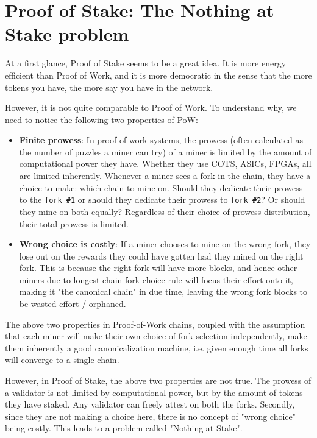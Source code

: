 \section{Proof of Stake: The Nothing at Stake problem}

At a first glance, Proof of Stake seems to be a great idea. It is more energy efficient than Proof of Work, and it is more democratic in the sense that the more tokens you have, the more say you have in the network.

However, it is not quite comparable to Proof of Work. To understand why, we need to notice the following two properties of PoW:

\begin{itemize}
    \item \textbf{Finite prowess}: In proof of work systems, the prowess (often calculated as the number of puzzles a miner can try) of a miner is limited by the amount of computational power they have. Whether they use COTS, ASICs, FPGAs, all are limited inherently. Whenever a miner sees a fork in the chain, they have a choice to make: which chain to mine on. Should they dedicate their prowess to the \texttt{fork \#1} or should they dedicate their prowess to \texttt{fork \#2}? Or should they mine on both equally? Regardless of their choice of prowess distribution, their total prowess is limited.
    \item \textbf{Wrong choice is costly}: If a miner chooses to mine on the wrong fork, they lose out on the rewards they could have gotten had they mined on the right fork. This is because the right fork will have more blocks, and hence other miners due to longest chain fork-choice rule will focus their effort onto it, making it "the canonical chain" in due time, leaving the wrong fork blocks to be wasted effort / orphaned. 
\end{itemize}

The above two properties in Proof-of-Work chains, coupled with the assumption that each miner will make their own choice of fork-selection independently, make them inherently a good canonicalization machine, i.e. given enough time all forks will converge to a single chain. 

However, in Proof of Stake, the above two properties are not true. The prowess of a validator is not limited by computational power, but by the amount of tokens they have staked. Any validator can freely attest on both the forks. Secondly, since they are not making a choice here, there is no concept of "wrong choice" being costly. This leads to a problem called "Nothing at Stake".

